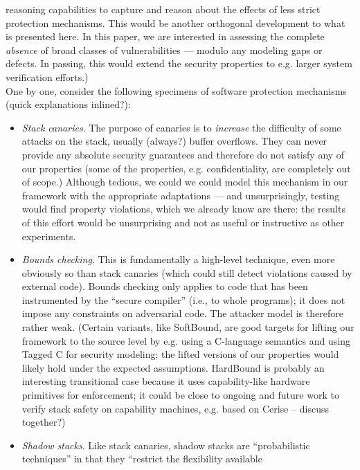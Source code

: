 {{reasoning} capabilities to capture and reason about the effects of less strict
protection mechanisms. This would be another orthogonal development to what is
presented here. In this paper, we are interested in assessing the complete
\emph{absence} of broad classes of vulnerabilities --- modulo any modeling gaps
or defects. In passing, this would extend the security properties to e.g. larger
system verification efforts.)
%
\\
%
One by one, consider the following specimens of software protection mechanisms
(quick explanations inlined?):
%
\\
%
\begin{itemize}
%
\item \emph{Stack canaries}. The purpose of canaries is to \emph{increase} the
  difficulty of some attacks on the stack, usually (always?) buffer overflows.
  They can never provide any absolute security guarantees and therefore do not
  satisfy any of our properties (some of the properties, e.g. confidentiality,
  are completely out of scope.) Although tedious, we could we could model this
  mechanism in our framework with the appropriate adaptations --- and
  unsurprisingly, testing would find property violations, which we already know
  are there: the results of this effort would be unsurprising and not as useful
  or instructive as other experiments.
%
\item \emph{Bounds checking}. This is fundamentally a high-level technique, even
  more obviously so than stack canaries (which could still detect violations
  caused by external code). Bounds checking only applies to code that has been
  instrumented by the ``secure compiler'' (i.e., to whole programs); it does not
  impose any constraints on adversarial code. The attacker model is therefore
  rather weak. (Certain variants, like SoftBound, are good targets for lifting
  our framework to the source level by e.g. using a C-language semantics and
  using Tagged C for security modeling; the lifted versions of our properties
  would likely hold under the expected assumptions. HardBound is probably an
  interesting transitional case because it uses capability-like hardware
  primitives for enforcement; it could be close to ongoing and future work to
  verify stack safety on capability machines, e.g. based on Cerise -- discuss
  together?)
%
\item \emph{Shadow stacks}. Like stack canaries, shadow stacks are
  ``probabilistic techniques'' in that they ``restrict the flexibility available

\end{itemize}}
